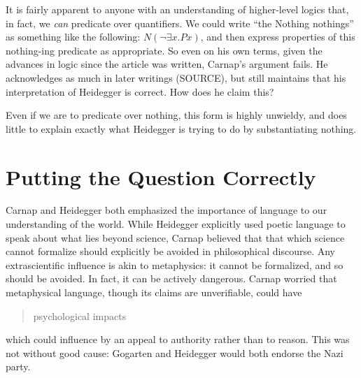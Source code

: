 \documentclass[leqno, 12pt]{turabian-researchpaper}
\begin{document}
	It is fairly apparent to anyone with an understanding of higher-level logics that,
	in fact, we \emph{can} predicate over quantifiers. We could write \enquote{the Nothing nothings}
	as something like the following: $N(\neg\exists x . Px)$, and then express
	properties of this nothing-ing predicate as appropriate. So even on his own terms,
	given the advances in logic since the article was written, Carnap's argument fails.
	He acknowledges as much in later writings (SOURCE), but still maintains that his
	interpretation of Heidegger is correct. How does he claim this?

	Even if we are to predicate over nothing, this form is highly unwieldy, and
	does little to explain exactly what Heidegger is trying to do by
	substantiating nothing.

	\section{Putting the Question Correctly}

	Carnap and Heidegger both emphasized the importance of language to our understanding
	of the world. While Heidegger explicitly used poetic language to speak about
	what lies beyond science, Carnap believed that that which science cannot formalize
	should explicitly be avoided in philosophical discourse. Any extrascientific
	influence is akin to metaphysics: it cannot be formalized, and so should be
	avoided. In fact, it can be actively dangerous. Carnap worried that metaphysical
	language, though its claims are unverifiable, could have \blockquote[]{psychological impacts}
	which could influence by an appeal to authority rather than to reason. This was
	not without good cause: Gogarten and Heidegger would both endorse the Nazi
	party. \autocite{dambock2022}
\end{document}
